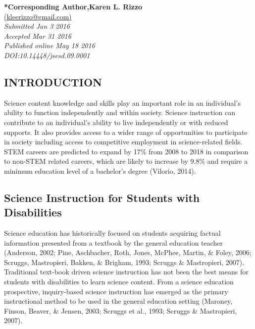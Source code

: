 \documentclass[11.5pt]{sig-alternate} %
\begin{document}
\textbf{*Corresponding Author,Karen L. Rizzo }\\
\href{mailto: kleerizzo@gmail.com }{(kleerizzo@gmail.com)} \\
\textit{Submitted  Jan 3 2016}\\
\textit{Accepted Mar 31 2016} \\
\textit{Published online May 18 2016} \\
\textit{DOI:10.14448/jsesd.09.0001} \\
\pagebreak
\clearpage
\begin{large}
\section*{INTRODUCTION}

Science content knowledge and skills play an important role in an individual’s ability to function independently and within society.  Science instruction can contribute to an individual’s ability to live independently or with reduced supports.  It also provides access to a wider range of opportunities to participate in society including access to competitive employment in science-related fields. STEM careers are predicted to expand by 17\% from 2008 to 2018 in comparison to non-STEM related careers, which are likely to increase by 9.8\% and require a minimum education level of a bachelor’s degree (Vilorio, 2014).   

\subsection*{Science Instruction for Students with Disabilities}
 
Science education has historically focused on students acquiring factual information presented from a textbook by the general education teacher (Anderson, 2002; Pine, Aschbacher, Roth, Jones, McPhee, Martin, \& Foley, 2006; Scruggs, Mastropieri, Bakken, \& Brigham, 1993; Scruggs \& Mastropieri, 2007).  Traditional text-book driven science instruction has not been the best means for students with disabilities to learn science content.  From a science education prospective, inquiry-based science instruction has emerged as the primary instructional method to be used in the general education setting (Maroney, Finson, Beaver, \& Jensen, 2003; Scruggs et al., 1993; Scruggs \& Mastropieri, 2007).   


\end{large}
\end{document}
